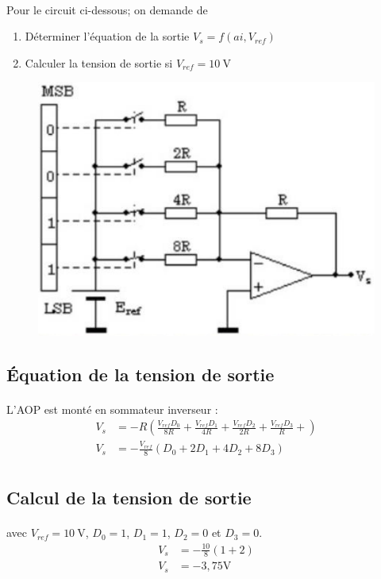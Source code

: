 \documentclass{article}
\begin{document}
\paragraph{}
Pour le circuit ci-dessous; on demande de
\begin{enumerate}
    \item Déterminer l'équation de la sortie $V_s = f(ai, V_{ref})$
    \item Calculer la tension de sortie si $V_{ref} = \SI{10}{\volt}$
\end{enumerate}
\begin{figure}[H]
    \centering
    \includegraphics[width=.5\linewidth]{images/CNA-resistances-ponderees.png}
\end{figure}

\subsection{Équation de la tension de sortie}
\paragraph{}
L'AOP est monté en sommateur inverseur :
\begin{align*}
    V_s &= -R \left(\frac{V_{ref}D_0}{8R} + \frac{V_{ref}D_1}{4R} + \frac{V_{ref}D_2}{2R} + \frac{V_{ref}D_3}{R} + \right)\\
    V_s &= -\frac{V_{ref}}{8} \left(D_0 + 2D_1 + 4D_2 + 8D_3\right)\\
\end{align*}

\subsection{Calcul de la tension de sortie}
\paragraph{}
avec $V_{ref} = \SI{10}{\volt}$, $D_0 = 1$, $D_1 = 1$, $D_2 = 0$ et  $D_3 = 0$.
\begin{align*}
    V_s &= -\frac{10}{8} \left(1 + 2\right)\\
    V_s &= -3,75 \si{\volt}\\
\end{align*}
\end{document}
